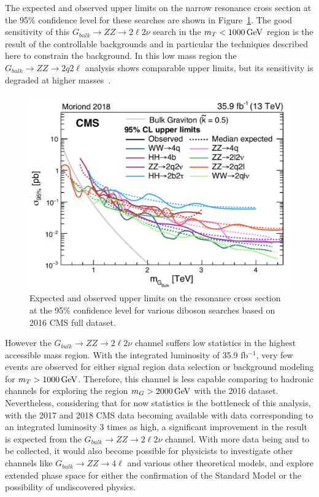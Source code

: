 The expected and observed upper limits on the narrow resonance cross section at the 95\% confidence level for these searches are shown in Figure~\ref{fig:sum_bulkGlimits}. The good sensitivity of this $G_{bulk}\rightarrow ZZ\rightarrow 2\ell 2\nu$ search in the $m_T < 1000\,\text{Ge\hspace{-.08em}V}$ region is the result of the controllable backgrounds and in particular the techniques described here to constrain the \Zjets background. In this low mass region the $G_{bulk}\rightarrow ZZ\rightarrow 2q 2\ell$ analysis shows comparable upper limits, but its sensitivity is degraded at higher masses~\cite{sum_zzqqll}.
\begin{figure}[htbp]
\begin{center}
\includegraphics[width=0.9\linewidth]{figures/sum_bulkGlimits.pdf}
\caption{Expected and observed upper limits on the resonance cross section at the 95\% confidence level for various diboson searches based on 2016 CMS full dataset.}
\label{fig:sum_bulkGlimits}
\end{center}
\end{figure}

\vspace{0.3cm}
However the $G_{bulk}\rightarrow ZZ\rightarrow 2\ell 2\nu$ channel suffers low statistics in the highest accessible mass region. With the integrated luminosity of 35.9 fb$^{-1}$, very few events are observed for either signal region data selection or background modeling for $m_T >1000\,\text{Ge\hspace{-.08em}V}$. Therefore, this channel is less capable comparing to hadronic channels for exploring the region $m_G >2000\,\text{Ge\hspace{-.08em}V}$ with the 2016 dataset. Nevertheless, considering that for now statistics is the bottleneck of this analysis, with the 2017 and 2018 CMS data becoming available with data corresponding to an integrated luminosity 3 times as high, a significant improvement in the result is expected from the $G_{bulk}\rightarrow ZZ\rightarrow 2\ell 2\nu$ channel. With more data being and to be collected, it would also become possible for physicists to investigate other channels like $G_{bulk}\rightarrow ZZ\rightarrow 4\ell$ and various other theoretical models, and explore extended phase space for either the confirmation of the Standard Model or the possibility of undiscovered physics. 

